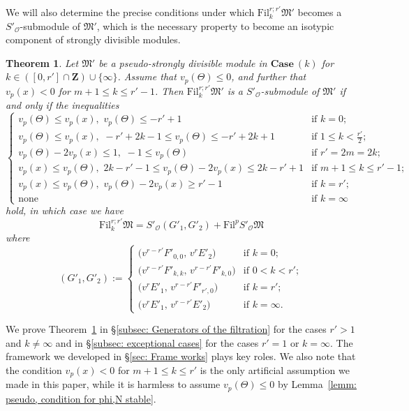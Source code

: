 \documentclass[11pt]{amsart}
\theoremstyle{definition}
\numberwithin{equation}{subsection}
\theoremstyle{plain}
\newtheorem{theo}[equation]{Theorem}
\theoremstyle{plain}
\theoremstyle{plain}
\theoremstyle{plain}
\theoremstyle{plain}
\theoremstyle{plain}
\theoremstyle{plain}
\theoremstyle{plain}
\theoremstyle{plain}
\theoremstyle{plain}
\theoremstyle{plain}
\theoremstyle{plain}
\theoremstyle{definition}
\theoremstyle{definition}
\theoremstyle{definition}
\theoremstyle{remark}
\renewcommand{\(}{\textup{(}}
\renewcommand{\)}{\textup{)}}
\newcommand{\Z}{\mathbf{Z}}
\newcommand{\fM}{\mathfrak{M}}
\newcommand{\Fil}{\mathrm{Fil}}
\newcommand{\cO}{\mathcal{O}}
\begin{document}
We will also determine the precise conditions under which $\Fil^{r;r'}_k\fM'$ becomes a $S'_\cO$-submodule of $\fM'$, which is the necessary property to become an isotypic component of strongly divisible modules. 
\begin{theo}\label{theo: filtration of pseudo}
Let $\fM'$ be a pseudo-strongly divisible module in $\mathbf{Case}~(k)$ for $k\in ([0,r']\cap\Z)\cup\{\infty\}$. Assume that $v_p(\Theta)\leq 0$, and further that $v_p(x)<0$ for $m+1\leq k\leq r'-1$. Then $\Fil_k^{r;r'}\fM'$ is a $S'_\cO$-submodule of $\fM'$ if and only if the inequalities
\begin{equation*} 
\begin{cases}
                v_p(\Theta)\leq v_p(x),\,\, v_p(\Theta)\leq -r'+1  & \mbox{if }k=0;\\
                v_p(\Theta)\leq v_p(x),\,\,-r'+2k-1\leq v_p(\Theta)\leq -r'+2k+1
 & \mbox{if } 1\leq k< \frac{r'}{2};\\
                v_p(\Theta)-2v_p(x)\leq 1,\,\,-1\leq v_p(\Theta) &\mbox{if } r'=2m=2k;\\
                v_p(x)\leq v_p(\Theta),\,\, 2k-r'-1\leq v_p(\Theta)-2v_p(x)\leq 2k-r'+1
 &\mbox{if }m+1\leq k\leq r'-1;\\
                v_p(x)\leq v_p(\Theta),\,\, v_p(\Theta)-2v_p(x)\geq r'-1 &\mbox{if }k=r';\\
                \mbox{none} &\mbox{if }k=\infty
\end{cases}
\end{equation*}
hold, in which case we have 
$$\Fil^{r;r'}_{k}\fM=S'_{\cO}(G'_1,G'_2)+\Fil^pS'_{\cO}\fM$$
where
\begin{equation}\label{eq: filtration when r' leq r}
    (G'_1,G'_2):=
    \begin{cases}
        \big(v^{r-r'}F'_{0,0},\, v^{r}E'_2\big)  & \mbox{if }k=0; \\
        \big(v^{r-r'}F'_{k,k},\, v^{r-r'}F'_{k,0}\big) & \mbox{if }0< k<r'; \\
        \big(v^{r}E'_1,\, v^{r-r'}F'_{r',0}\big)  & \mbox{if }k=r'; \\
        \big(v^{r}E'_1,\, v^{r-r'}E'_2\big)  & \mbox{if }k=\infty.
    \end{cases}
\end{equation}
\end{theo}


We prove Theorem~\ref{theo: filtration of pseudo} in \S\ref{subsec: Generators of the filtration} for the cases $r'>1$ and $k\neq\infty$ and in \S\ref{subsec: exceptional cases} for the cases $r'=1$ or $k=\infty$. The framework we developed in \S\ref{sec: Frame works} plays key roles. We also note that the condition $v_p(x)<0$ for $m+1\leq k\leq r'$ is the only artificial assumption we made in this paper, while it is harmless to assume $v_p(\Theta)\leq 0$ by Lemma~\ref{lemm: pseudo, condition for phi,N stable}.
\end{document}
